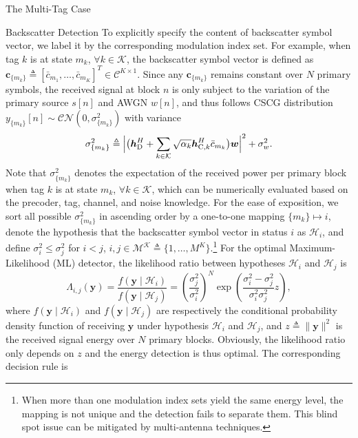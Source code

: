 \documentclass[journal]{IEEEtran}
\begin{document}
\begin{section}{The Multi-Tag Case}
\begin{subsection}{Backscatter Detection}
			To explicitly specify the content of backscatter symbol vector, we label it by the corresponding modulation index set. For example, when tag $k$ is at state $m_k$, $\forall k \in \mathcal{K}$, the backscatter symbol vector is defined as $\boldsymbol{c}_{\{m_k\}} \triangleq [\bar{c}_{m_1},\ldots,\bar{c}_{m_K}]^T \in \mathcal{C}^{K \times 1}$. Since any $\boldsymbol{c}_{\{m_k\}}$ remains constant over $N$ primary symbols, the received signal at block $n$ is only subject to the variation of the primary source $s[n]$ and AWGN $w[n]$, and thus follows CSCG distribution $y_{\{m_k\}}[n] \sim \mathcal{CN}\left(0,\sigma_{\{m_k\}}^2\right)$ with variance
			\begin{equation}
				\sigma_{\{m_k\}}^2 \triangleq \Bigl\lvert \bigl(\boldsymbol{h}_{\mathrm{D}}^H + \sum_{k \in \mathcal{K}} \sqrt{\alpha_k} \boldsymbol{h}_{\mathrm{C},k}^H \bar{c}_{m_k}\bigr) \boldsymbol{w} \Bigr\rvert^2 + \sigma_w^2.
				\label{eq:receive_variance}
			\end{equation}
			Note that $\sigma_{\{m_k\}}^2$ denotes the expectation of the received power per primary block when tag $k$ is at state $m_k$, $\forall k \in \mathcal{K}$, which can be numerically evaluated based on the precoder, tag, channel, and noise knowledge. For the ease of exposition, we sort all possible $\sigma_{\{m_k\}}^2$ in ascending order by a one-to-one mapping $\{m_k\} \mapsto i$, denote the hypothesis that the backscatter symbol vector in status $i$ as $\mathcal{H}_i$, and define $\sigma_i^2 \le \sigma_j^2$ for $i < j$, $i,j \in \mathcal{M^K} \triangleq \{1,\ldots,M^K\}$.\footnote{When more than one modulation index sets yield the same energy level, the mapping is not unique and the detection fails to separate them. This blind spot issue can be mitigated by multi-antenna techniques.} For the optimal Maximum-Likelihood (ML) detector, the likelihood ratio between hypotheses $\mathcal{H}_i$ and $\mathcal{H}_j$ is \cite{Qian2019}
			\begin{equation}
				\Lambda_{i,j}(\boldsymbol{y}) = \frac{f(\boldsymbol{y} \mid \mathcal{H}_i)}{f(\boldsymbol{y} \mid \mathcal{H}_j)} = \left( \frac{\sigma_j^2}{\sigma_i^2} \right)^N \exp \left( \frac{\sigma_i^2 - \sigma_j^2}{\sigma_i^2 \sigma_j^2} z \right),
				\label{eq:likelihood_ratio}
			\end{equation}
			where $f(\boldsymbol{y} \mid \mathcal{H}_i)$ and $f(\boldsymbol{y} \mid \mathcal{H}_j)$ are respectively the conditional probability density function of receiving $\boldsymbol{y}$ under hypothesis $\mathcal{H}_i$ and $\mathcal{H}_j$, and $z \triangleq \lVert \boldsymbol{y} \rVert^2$ is the received signal energy over $N$ primary blocks. Obviously, the likelihood ratio only depends on $z$ and the energy detection is thus optimal. The corresponding decision rule is

\end{subsection}
\end{section}
\end{document}
